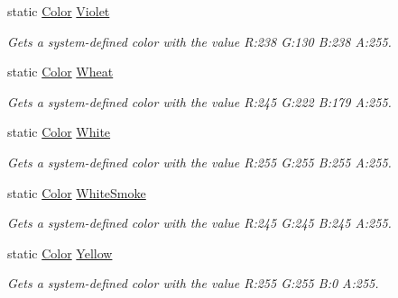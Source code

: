 \begin{DoxyCompactItemize}
static \hyperlink{struct_microsoft_1_1_xna_1_1_framework_1_1_color}{Color} \hyperlink{struct_microsoft_1_1_xna_1_1_framework_1_1_color_af59a0afe64a4809c55d9ccda1ba5c4ff}{Violet}
\begin{DoxyCompactList}\small\item\em Gets a system-\/defined color with the value R\+:238 G\+:130 B\+:238 A\+:255.\end{DoxyCompactList}\item 
static \hyperlink{struct_microsoft_1_1_xna_1_1_framework_1_1_color}{Color} \hyperlink{struct_microsoft_1_1_xna_1_1_framework_1_1_color_a24ec13e7a204ec1c4f1697ff81483b4c}{Wheat}
\begin{DoxyCompactList}\small\item\em Gets a system-\/defined color with the value R\+:245 G\+:222 B\+:179 A\+:255.\end{DoxyCompactList}\item 
static \hyperlink{struct_microsoft_1_1_xna_1_1_framework_1_1_color}{Color} \hyperlink{struct_microsoft_1_1_xna_1_1_framework_1_1_color_af56dccd04a51f0411a933a3662b7cec6}{White}
\begin{DoxyCompactList}\small\item\em Gets a system-\/defined color with the value R\+:255 G\+:255 B\+:255 A\+:255.\end{DoxyCompactList}\item 
static \hyperlink{struct_microsoft_1_1_xna_1_1_framework_1_1_color}{Color} \hyperlink{struct_microsoft_1_1_xna_1_1_framework_1_1_color_a33c7dafb52654e1343b222a5b588961e}{White\+Smoke}
\begin{DoxyCompactList}\small\item\em Gets a system-\/defined color with the value R\+:245 G\+:245 B\+:245 A\+:255.\end{DoxyCompactList}\item 
static \hyperlink{struct_microsoft_1_1_xna_1_1_framework_1_1_color}{Color} \hyperlink{struct_microsoft_1_1_xna_1_1_framework_1_1_color_a3db519f31499708443925dfff3b47793}{Yellow}
\begin{DoxyCompactList}\small\item\em Gets a system-\/defined color with the value R\+:255 G\+:255 B\+:0 A\+:255.\end{DoxyCompactList}\item 

\end{DoxyCompactItemize}
